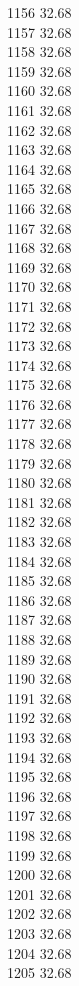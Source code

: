 1156	32.68\\
1157	32.68\\
1158	32.68\\
1159	32.68\\
1160	32.68\\
1161	32.68\\
1162	32.68\\
1163	32.68\\
1164	32.68\\
1165	32.68\\
1166	32.68\\
1167	32.68\\
1168	32.68\\
1169	32.68\\
1170	32.68\\
1171	32.68\\
1172	32.68\\
1173	32.68\\
1174	32.68\\
1175	32.68\\
1176	32.68\\
1177	32.68\\
1178	32.68\\
1179	32.68\\
1180	32.68\\
1181	32.68\\
1182	32.68\\
1183	32.68\\
1184	32.68\\
1185	32.68\\
1186	32.68\\
1187	32.68\\
1188	32.68\\
1189	32.68\\
1190	32.68\\
1191	32.68\\
1192	32.68\\
1193	32.68\\
1194	32.68\\
1195	32.68\\
1196	32.68\\
1197	32.68\\
1198	32.68\\
1199	32.68\\
1200	32.68\\
1201	32.68\\
1202	32.68\\
1203	32.68\\
1204	32.68\\
1205	32.68\\
